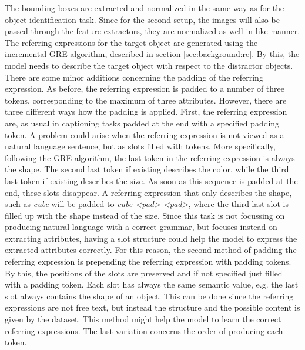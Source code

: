 The bounding boxes are extracted and normalized in the same way as for the object identification task.
Since for the second setup, the images will also be passed through the feature extractors, they are normalized as well in like manner.
The referring expressions for the target object are generated using the incremental GRE-algorithm, described in section \ref{sec:background:re}.
By this, the model needs to describe the target object with respect to the distractor objects.
There are some minor additions concerning the padding of the referring expression.
As before, the referring expression is padded to a number of three tokens, corresponding to the maximum of three attributes.
However, there are three different ways how the padding is applied.
First, the referring expression are, as usual in captioning tasks padded at the end with a specified padding token.
A problem could arise when the referring expression is not viewed as a natural language sentence, but as slots filled with tokens.
More specifically, following the GRE-algorithm, the last token in the referring expression is always the shape.
The second last token if existing describes the color, while the third last token if existing describes the size.
As soon as this sequence is padded at the end, these slots disappear.
A referring expression that only describes the shape, such as \emph{cube} will be padded to \emph{cube <pad> <pad>}, where the third last slot is filled up with the shape instead of the size.
Since this task is not focussing on producing natural language with a correct grammar, but focuses instead on extracting attributes, having a slot structure could help the model to express the extracted attributes correctly.
For this reason, the second method of padding the referring expression is prepending the referring expression with padding tokens.
By this, the positions of the slots are preserved and if not specified just filled with a padding token.
Each slot has always the same semantic value, e.g. the last slot always contains the shape of an object.
This can be done since the referring expressions are not free text, but instead the structure and the possible content is given by the dataset.
This method might help the model to learn the correct referring expressions.
The last variation concerns the order of producing each token.
